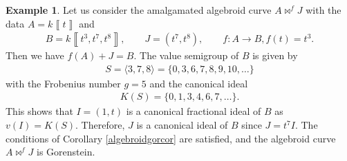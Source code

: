 \documentclass{amsart}%
\theoremstyle{plain}
\numberwithin{equation}{section}
\theoremstyle{definition}
\newtheorem{example}{Example}[section]
\begin{document}
\begin{example}
    Let us consider the amalgamated algebroid curve $A\bowtie^f J$ with the data $A=k\left\llbracket t \right\rrbracket$ and 
    \begin{align*}
        B=k\left\llbracket t^3,t^7,t^8\right\rrbracket, \qquad J=\left(t^7,t^8\right), \qquad f:A\to B, f(t)=t^3.
    \end{align*}
    Then we have $f(A)+J=B$. The value semigroup of $B$ is given by
    \begin{align*}
        S=\langle3,7,8\rangle=\{0,3,6,7,8,9,10,\ldots\}
    \end{align*}
    with the Frobenius number $g=5$ and the canonical ideal
    \begin{align*}
        K(S)=\{0,1,3,4,6,7,\ldots\}.
    \end{align*}
    This shows that $I=(1,t)$ is a canonical fractional ideal of $B$ as $v(I)=K(S)$. Therefore, $J$ is a canonical ideal of $B$ since $J=t^7 I$. The conditions of Corollary \ref{algebroidgorcor} are satisfied, and the algebroid curve $A\bowtie^f J$ is Gorenstein.
    
\end{example}
\end{document}

